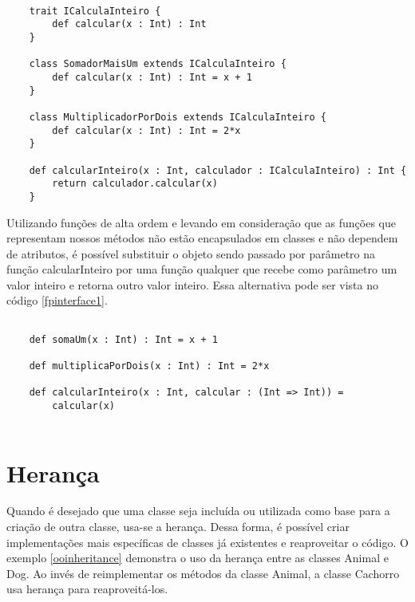 
\begin{lstlisting}[caption={Interfaces em Orientação a Objetos},label=oopinterface1]
    
    trait ICalculaInteiro {
        def calcular(x : Int) : Int
    }

    class SomadorMaisUm extends ICalculaInteiro {
        def calcular(x : Int) : Int = x + 1
    }

    class MultiplicadorPorDois extends ICalculaInteiro {
        def calcular(x : Int) : Int = 2*x
    }

    def calcularInteiro(x : Int, calculador : ICalculaInteiro) : Int {
        return calculador.calcular(x)
    }

\end{lstlisting}

Utilizando funções de alta ordem e levando em 
consideração que as funções que representam nossos 
métodos não estão encapsulados em classes e 
não dependem de atributos, é possível substituir o 
objeto sendo passado por parâmetro na função 
calcularInteiro por uma função qualquer que recebe 
como parâmetro um valor inteiro e retorna outro 
valor inteiro. Essa alternativa pode ser vista 
no código \ref{fpinterface1}.

\begin{lstlisting}[caption={Interfaces em Programação Funcional},label=fpinterface1]
    
    def somaUm(x : Int) : Int = x + 1

    def multiplicaPorDois(x : Int) : Int = 2*x

    def calcularInteiro(x : Int, calcular : (Int => Int)) =
        calcular(x)
    
\end{lstlisting}



\section{Herança}

Quando é desejado que uma classe seja incluída ou 
utilizada como base para a criação de outra classe, 
usa-se a herança\cite{quarkoo}. Dessa forma, é 
possível criar implementações mais específicas 
de classes já existentes e reaproveitar o código. 
O exemplo \ref{ooinheritance} demonstra 
o uso da herança entre as classes Animal e Dog. 
Ao invés de reimplementar os métodos da classe 
Animal, a classe Cachorro usa herança para reaproveitá-los. 

